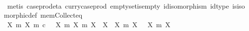 \begin{isabellebody}
\ \ \ \ \isamarkupfalse%
\ {\isacharparenleft}{\kern0pt}metis\ case{\isacharunderscore}{\kern0pt}prod{\isacharunderscore}{\kern0pt}eta\ curry{\isacharunderscore}{\kern0pt}case{\isacharunderscore}{\kern0pt}prod\ emptyset{\isacharunderscore}{\kern0pt}is{\isacharunderscore}{\kern0pt}empty\ id{\isacharunderscore}{\kern0pt}isomorphism\ id{\isacharunderscore}{\kern0pt}type\ is{\isacharunderscore}{\kern0pt}isomorphic{\isacharunderscore}{\kern0pt}def\ mem{\isacharunderscore}{\kern0pt}Collect{\isacharunderscore}{\kern0pt}eq{\isacharparenright}{\kern0pt}\isanewline
\isanewline
\ \ \isamarkupfalse%
\ {\isachardoublequoteopen}{\isacharbraceleft}{\kern0pt}{\isacharparenleft}{\kern0pt}X{\isacharcomma}{\kern0pt}\ m{\isacharparenright}{\kern0pt}{\isachardot}{\kern0pt}\ {\isacharparenleft}{\kern0pt}X{\isacharcomma}{\kern0pt}\ m{\isacharparenright}{\kern0pt}\ {\isasymsubseteq}\isactrlsub c\ {\isasymone}{\isacharbraceright}{\kern0pt}\ {\isacharslash}{\kern0pt}{\isacharslash}{\kern0pt}\ {\isacharbraceleft}{\kern0pt}{\isacharparenleft}{\kern0pt}{\isacharparenleft}{\kern0pt}X{}{\isacharcomma}{\kern0pt}\ m{}{\isacharparenright}{\kern0pt}{\isacharcomma}{\kern0pt}\ {\isacharparenleft}{\kern0pt}X{}{\isacharcomma}{\kern0pt}\ m{}{\isacharparenright}{\kern0pt}{\isacharparenright}{\kern0pt}{\isachardot}{\kern0pt}\ X{}\ {\isasymcong}\ X{}{\isacharbraceright}{\kern0pt}\ {\isacharequal}{\kern0pt}\ {\isacharbraceleft}{\kern0pt}{\isacharbraceleft}{\kern0pt}{\isacharparenleft}{\kern0pt}X{\isacharcomma}{\kern0pt}\ m{\isacharparenright}{\kern0pt}{\isachardot}{\kern0pt}\ X\ {\isasymcong}\ {\isasymemptyset}{\isacharbraceright}{\kern0pt}{\isacharcomma}{\kern0pt}\ {\isacharbraceleft}{\kern0pt}{\isacharparenleft}{\kern0pt}X{\isacharcomma}{\kern0pt}\ m{\isacharparenright}{\kern0pt}{\isachardot}{\kern0pt}\ X\ {\isasymcong}\ {\isasymone}{\isacharbraceright}{\kern0pt}{\isacharbraceright}{\kern0pt}{\isachardoublequoteclose}\isanewline
\ \ \isamarkupfalse%
\isanewline
\ \ \ \ \isamarkupfalse%

\end{isabellebody}
